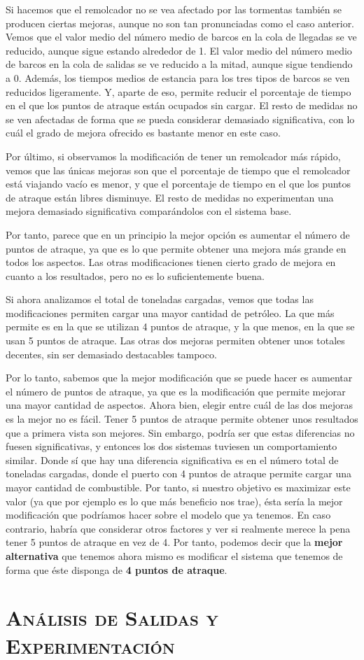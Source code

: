 \documentclass[11pt,a4paper]{article}
\begin{document}
Si hacemos que el remolcador no se vea afectado por las tormentas también se producen
ciertas mejoras, aunque no son tan pronunciadas como el caso anterior. Vemos que el
valor medio del número medio de barcos en la cola de llegadas se ve reducido, aunque
sigue estando alrededor de 1. El valor medio del número medio de barcos en la cola de
salidas se ve reducido a la mitad, aunque sigue tendiendo a 0. Además, los tiempos
medios de estancia para los tres tipos de barcos se ven reducidos ligeramente. Y,
aparte de eso, permite reducir el porcentaje de tiempo en el que los puntos de atraque
están ocupados sin cargar. El resto de medidas no se ven afectadas de forma que se
pueda considerar demasiado significativa, con lo cuál el grado de mejora ofrecido
es bastante menor en este caso.

Por último, si observamos la modificación de tener un remolcador más rápido, vemos que las
únicas mejoras son que el porcentaje de tiempo que el remolcador está viajando vacío
es menor, y que el porcentaje de tiempo en el que los puntos de atraque están libres
disminuye. El resto de medidas no experimentan una mejora demasiado significativa
comparándolos con el sistema base.

Por tanto, parece que en un principio la mejor opción es aumentar el número de puntos
de atraque, ya que es lo que permite obtener una mejora más grande en todos los
aspectos. Las otras modificaciones tienen cierto grado de mejora en cuanto a los
resultados, pero no es lo suficientemente buena.

Si ahora analizamos el total de toneladas cargadas, vemos que todas las modificaciones
permiten cargar una mayor cantidad de petróleo. La que más permite es en la que se utilizan
4 puntos de atraque, y la que menos, en la que se usan 5 puntos de atraque. Las otras
dos mejoras permiten obtener unos totales decentes, sin ser demasiado destacables
tampoco.

Por lo tanto, sabemos que la mejor modificación que se puede hacer es aumentar
el número de puntos de atraque, ya que es la modificación que permite mejorar
una mayor cantidad de aspectos. Ahora bien, elegir entre cuál de las dos mejoras
es la mejor no es fácil. Tener 5 puntos de atraque permite obtener unos resultados
que a primera vista son mejores. Sin embargo, podría ser que estas diferencias
no fuesen significativas, y entonces los dos sistemas tuviesen un comportamiento
similar. Donde sí que hay una diferencia significativa es en el número total de
toneladas cargadas, donde el puerto con 4 puntos de atraque permite cargar
una mayor cantidad de combustible. Por tanto, si nuestro objetivo es maximizar
este valor (ya que por ejemplo es lo que más beneficio nos trae), ésta sería
la mejor modificación que podríamos hacer sobre el modelo que ya tenemos. En caso
contrario, habría que considerar otros factores y ver si realmente merece la pena
tener 5 puntos de atraque en vez de 4. Por tanto, podemos decir que la \textbf{mejor
alternativa} que tenemos ahora mismo es modificar el sistema que tenemos
de forma que éste disponga de \textbf{4 puntos de atraque}.


\newpage

\section{\textsc{Análisis de Salidas y Experimentación}}
\end{document}
